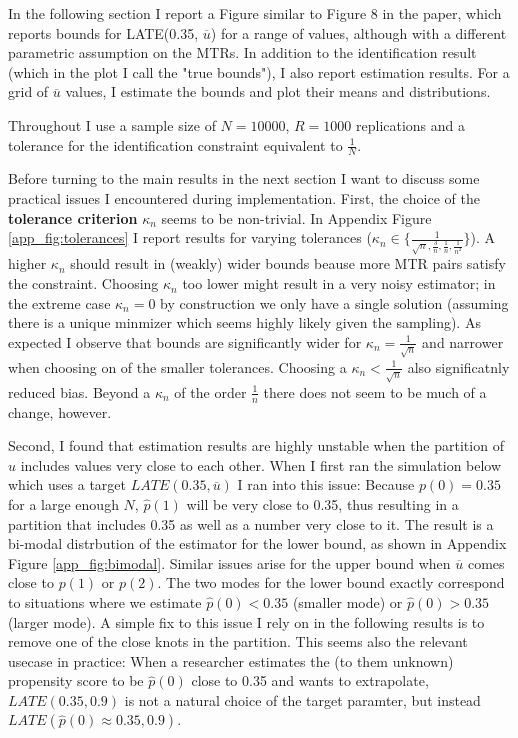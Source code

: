 \documentclass{article}
\begin{document}
In the following section I report a Figure similar to Figure 8 in the paper, which reports bounds for LATE(0.35, $\overline{u}$) for a range of values, although with a different parametric assumption on the MTRs.
In addition to the identification result (which in the plot I call the "true bounds"), I also report estimation results.
For a grid of $\overline{u}$ values, I estimate the bounds and plot their means and distributions.

Throughout I use a sample size of $N=10000$, $R=1000$ replications and a tolerance for the identification constraint equivalent to $\frac{1}{N}$.

Before turning to the main results in the next section I want to discuss some practical issues I encountered during implementation. 
First, the choice of the \textbf{tolerance criterion} $\kappa_n$ seems to be non-trivial. In Appendix Figure \ref{app_fig:tolerances} I report results for varying tolerances ($\kappa_n \in \{\frac{1}{\sqrt{n}, \frac{3}{n}, \frac{1}{n}, \frac{1}{n^2}}\}$).
A higher $\kappa_n$ should result in (weakly) wider bounds beause more MTR pairs satisfy the constraint. Choosing $\kappa_n$ too lower might result in a very noisy estimator; in the extreme case $\kappa_n = 0$ by construction we only have a single solution (assuming there is a unique minmizer which seems highly likely given the sampling).
As expected I observe that bounds are significantly wider for $\kappa_n = \frac{1}{\sqrt{n}}$ and narrower when choosing on of the smaller tolerances. Choosing a $\kappa_n<\frac{1}{\sqrt{n}}$ also significatnly reduced bias. 
Beyond a $\kappa_n$ of the order $\frac{1}{n}$ there does not seem to be much of a change, however.

Second, I found that estimation results are highly unstable when the partition of $u$ includes values very close to each other. 
When I first ran the simulation below which uses a target $LATE(0.35, \overline{u})$ I ran into this issue:
Because $p(0) = 0.35$ for a large enough $N$, $\hat{p}(1)$ will be very close to 0.35, thus resulting in a partition that includes 0.35 as well as a number very close to it.
The result is a bi-modal distrbution of the estimator for the lower bound, as shown in Appendix Figure \ref{app_fig:bimodal}. Similar issues arise for the upper bound when $\overline{u}$ comes close to $p(1)$ or $p(2)$.
The two modes for the lower bound exactly correspond to situations where we estimate $\hat{p}(0) < 0.35$ (smaller mode) or $\hat{p}(0) > 0.35$ (larger mode).
A simple fix to this issue I rely on in the following results is to remove one of the close knots in the partition. 
This seems also the relevant usecase in practice: When a researcher estimates the (to them unknown) propensity score to be $\hat{p}(0)$ close to 0.35 and wants to extrapolate, $LATE(0.35, 0.9)$ is not a natural choice of the target paramter, but instead $LATE(\hat{p}(0)\approx0.35, 0.9)$.
\end{document}
